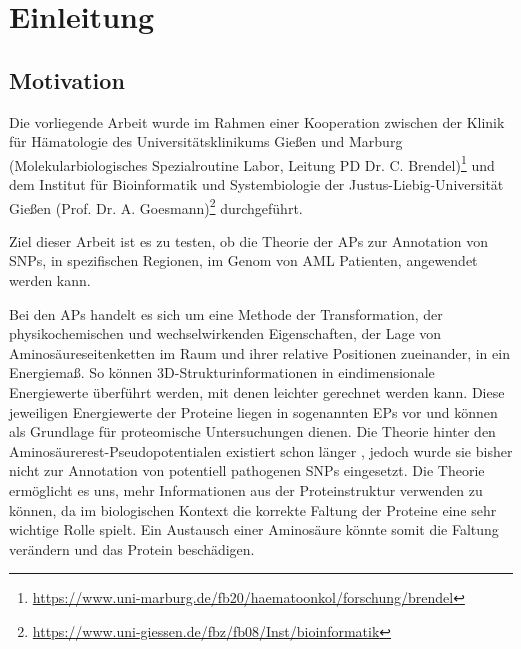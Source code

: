 \chapter{Einleitung}
\label{cha:Einleitung}

\section{Motivation}


Die vorliegende Arbeit wurde im Rahmen einer Kooperation zwischen der Klinik für Hämatologie des Universitätsklinikums Gießen und Marburg (Molekularbiologisches Spezialroutine Labor, Leitung PD Dr. C. Brendel)\footnote{\url{https://www.uni-marburg.de/fb20/haematoonkol/forschung/brendel}} und dem Institut für Bioinformatik und Systembiologie der Justus-Liebig-Universität Gießen (Prof. Dr. A. Goesmann)\footnote{\url{https://www.uni-giessen.de/fbz/fb08/Inst/bioinformatik}} durchgeführt. 


Ziel dieser Arbeit ist es zu testen, ob die Theorie der \ac{APs} zur Annotation von \ac{SNP}s, in spezifischen Regionen, im Genom von \ac{AML} Patienten, angewendet werden kann.

Bei den \ac{APs} handelt es sich um eine Methode der Transformation, der physikochemischen und wechselwirkenden Eigenschaften, der Lage von Aminosäureseitenketten im Raum und ihrer relative Positionen zueinander, in ein Energiemaß. 
So können 3D-Strukturinformationen in eindimensionale Energiewerte überführt werden, mit denen leichter gerechnet werden kann. Diese jeweiligen Energiewerte der Proteine liegen in sogenannten \ac{EP}s vor und können als Grundlage für proteomische Untersuchungen dienen. Die Theorie hinter den Aminosäurerest-Pseudopotentialen existiert schon länger \cite{Heinke.2011}, jedoch wurde sie bisher nicht zur Annotation von potentiell pathogenen \ac{SNP}s eingesetzt. Die Theorie ermöglicht es uns, mehr Informationen aus der Proteinstruktur verwenden zu können, da im biologischen Kontext die korrekte Faltung der Proteine eine sehr wichtige Rolle spielt. Ein Austausch einer Aminosäure könnte somit die Faltung verändern und das Protein beschädigen. 

